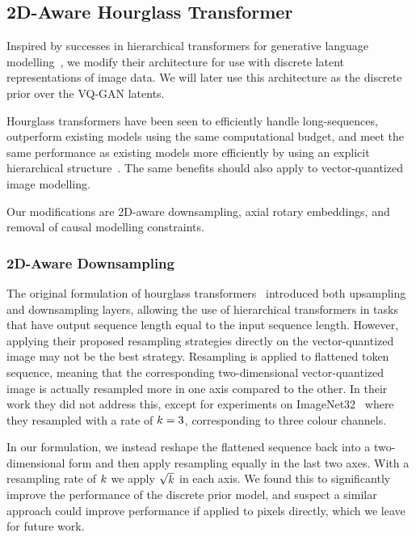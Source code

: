 \subsection{2D-Aware Hourglass Transformer}
Inspired by successes in hierarchical transformers for generative language
modelling~\cite{nawrot2021hierarchical}, we modify their architecture for use
with discrete latent representations of image data. We will later use this
architecture as the discrete prior over the VQ-GAN latents. 

Hourglass transformers have been seen to efficiently handle long-sequences,
outperform existing models using the same computational budget, and meet the
same performance as existing models more efficiently by using an explicit
hierarchical structure~\cite{nawrot2021hierarchical}. The same benefits should
also apply to vector-quantized image modelling.

Our modifications are 2D-aware downsampling, axial rotary embeddings, and
removal of causal modelling constraints.

\subsubsection{2D-Aware Downsampling}

The original formulation of hourglass transformers~\cite{nawrot2021hierarchical}
introduced both upsampling and downsampling layers, allowing the use of
hierarchical transformers in tasks that have output sequence length equal to the
input sequence length. However, applying their proposed resampling strategies directly on
the vector-quantized image may not be the best strategy. Resampling is applied
to flattened token sequence, meaning that the corresponding two-dimensional
vector-quantized image is actually resampled more in one axis compared to the
other. In their work they did not address this, except for experiments on
ImageNet32~\cite{russakovsky2015imagenet} where they resampled with a rate of
$k=3$, corresponding to three colour channels.

In our formulation, we instead reshape the flattened sequence back into a
two-dimensional form and then apply resampling equally in the last two axes.
With a resampling rate of $k$ we apply $\sqrt{k}$ in each axis. We found this to
significantly improve the performance of the discrete prior model, and suspect a
similar approach could improve performance if applied to pixels directly, which
we leave for future work.

